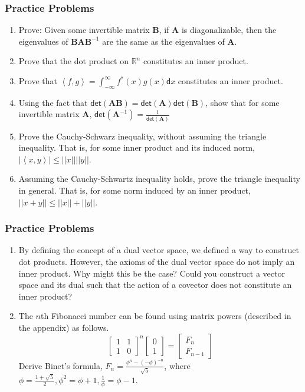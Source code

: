 \documentclass[10pt]{beamer}
\begin{document}
\begin{frame}
  \frametitle{Practice Problems}
  \begin{enumerate}
  \item Prove: Given some invertible matrix $\mathbf{B}$, if $\mathbf{A}$ is diagonalizable, then the eigenvalues of $\mathbf{BAB}^{-1}$ are the same as the eigenvalues of $\mathbf{A}$.
  \item Prove that the dot product on $\mathbb{R}^n$ constitutes an inner product.
  \item Prove that $\left<f, g\right> = \int_{-\infty}^{\infty} f^*(x)g(x)\mathsf{d}x$ constitutes an inner product.
  \item Using the fact that $\mathsf{det}(\mathbf{AB}) = \mathsf{det}(\mathbf{A})\mathsf{det}(\mathbf{B})$, show that for some invertible matrix $\mathbf{A}$, $\mathsf{det}(\mathbf{A}^{-1}) = \frac{1}{\mathsf{det}(\mathbf{A})}$
  \item Prove the Cauchy-Schwarz inequality, without assuming the triangle inequality. That is, for some inner product and its induced norm, $\left|\left<x, y\right>\right| \le \left|\left|x\right|\right|\left|\left|y\right|\right|$.
  \item Assuming the Cauchy-Schwartz inequality holds, prove the triangle inequality in general. That is, for some norm induced by an inner product, $\left|\left|x + y\right|\right| \le \left|\left|x\right|\right| + \left|\left|y\right|\right|$.
  \end{enumerate}
\end{frame}
\begin{frame}
  \frametitle{Practice Problems}
  \begin{enumerate}
  \item By defining the concept of a dual vector space, we defined a way to construct dot products. However, the axioms of the dual vector space do not imply an inner product. Why might this be the case? Could you construct a vector space and its dual such that the action of a covector does not constitute an inner product?
  \item The $n$th Fibonacci number can be found using matrix powers (described in the appendix) as follows.
    $$\left[\begin{matrix}
      1 & 1\\
      1 & 0
    \end{matrix}\right]^n\left[\begin{matrix}
      0\\
      1
    \end{matrix}\right] = \left[\begin{matrix}
      F_n\\
      F_{n - 1}
    \end{matrix}\right]$$
    Derive Binet's formula, $F_n = \frac{\phi^n - (-\phi)^{-n}}{\sqrt{5}}$, where $\phi = \frac{1 + \sqrt{5}}{2}, \phi^2 = \phi + 1, \frac{1}{\phi} = \phi - 1$.
  \end{enumerate}
\end{frame}
\end{document}
